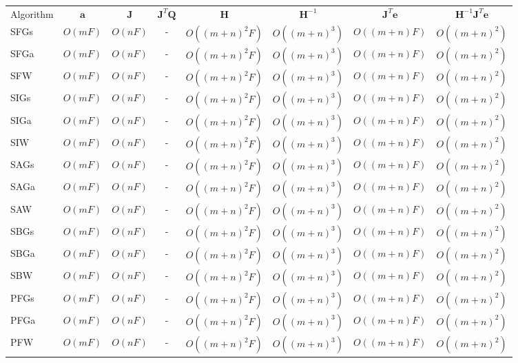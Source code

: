\begin{table*}
\begin{tabular}{lccccccc}
\hline\noalign{\smallskip}
Algorithm & $\mathbf{a}$ & $\mathbf{J}$ & $\mathbf{J}^T\mathbf{Q}$ & $\mathbf{H}$ & $\mathbf{H}^{-1}$ & $\mathbf{J}^T\mathbf{e}$ & $\mathbf{H}^{-1}\mathbf{J}^T\mathbf{e}$ \\
\noalign{\smallskip}\hline\noalign{\smallskip}

SFGs & $O(mF)$ & $O(nF)$ & - & $O((m+n)^2F)$ & $O((m+n)^3)$ & $O((m+n)F)$ & $O((m+n)^2)$ \\
SFGa & $O(mF)$ & $O(nF)$ & - & $O((m+n)^2F)$ & $O((m+n)^3)$ & $O((m+n)F)$ & $O((m+n)^2)$ \\
SFW & $O(mF)$ & $O(nF)$ & - & $O((m+n)^2F)$ & $O((m+n)^3)$ & $O((m+n)F)$ & $O((m+n)^2)$ \\

SIGs & $O(mF)$ & $O(nF)$ & - & $O((m+n)^2F)$ & $O((m+n)^3)$ & $O((m+n)F)$ & $O((m+n)^2)$ \\
SIGa & $O(mF)$ & $O(nF)$ & - & $O((m+n)^2F)$ & $O((m+n)^3)$ & $O((m+n)F)$ & $O((m+n)^2)$ \\
SIW & $O(mF)$ & $O(nF)$ & - & $O((m+n)^2F)$ & $O((m+n)^3)$ & $O((m+n)F)$ & $O((m+n)^2)$ \\

SAGs & $O(mF)$ & $O(nF)$ & - & $O((m+n)^2F)$ & $O((m+n)^3)$ & $O((m+n)F)$ & $O((m+n)^2)$ \\
SAGa & $O(mF)$ & $O(nF)$ & - & $O((m+n)^2F)$ & $O((m+n)^3)$ & $O((m+n)F)$ & $O((m+n)^2)$ \\
SAW & $O(mF)$ & $O(nF)$ & - & $O((m+n)^2F)$ & $O((m+n)^3)$ & $O((m+n)F)$ & $O((m+n)^2)$ \\

SBGs & $O(mF)$ & $O(nF)$ & - & $O((m+n)^2F)$ & $O((m+n)^3)$ & $O((m+n)F)$ & $O((m+n)^2)$ \\
SBGa & $O(mF)$ & $O(nF)$ & - & $O((m+n)^2F)$ & $O((m+n)^3)$ & $O((m+n)F)$ & $O((m+n)^2)$ \\
SBW & $O(mF)$ & $O(nF)$ & - & $O((m+n)^2F)$ & $O((m+n)^3)$ & $O((m+n)F)$ & $O((m+n)^2)$ \\

PFGs & $O(mF)$ & $O(nF)$ & - & $O((m+n)^2F)$ & $O((m+n)^3)$ & $O((m+n)F)$ & $O((m+n)^2)$ \\
PFGa & $O(mF)$ & $O(nF)$ & - & $O((m+n)^2F)$ & $O((m+n)^3)$ & $O((m+n)F)$ & $O((m+n)^2)$ \\
PFW & $O(mF)$ & $O(nF)$ & - & $O((m+n)^2F)$ & $O((m+n)^3)$ & $O((m+n)F)$ & $O((m+n)^2)$ \\


\end{tabular}
\end{table*}
